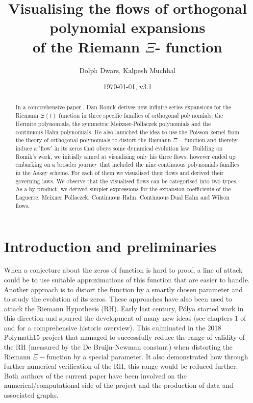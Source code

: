 \documentclass[a4paper,11pt,twoside]{amsart}
\title[Visualising the flows of orthogonal polynomial expansions of the Riemann $\Xi$-function]{Visualising the flows of orthogonal polynomial expansions \\ of the Riemann $\Xi$- function}
\author{Dolph Dwars, Kalpesh Muchhal}
\date{\today, v3.1}
\begin{document}
\begin{abstract}
In a comprehensive paper \cite{rom}, Dan Romik derives new infinite series expansions for the Riemann $\Xi(t)$ function in three specific families of orthogonal polynomials; the Hermite polynomials, the symmetric Meixner-Pollaczek polynomials and the continuous Hahn polynomials. He also launched the idea to use the Poisson kernel from the theory of orthogonal polynomials to distort the Riemann $\Xi-$function and thereby induce a 'flow' in its zeros that obeys some dynamical evolution law. Building on Romik's work, we initially aimed at visualising only his three flows, however ended up embarking on a broader journey that included the nine continuous polynomials families in the Askey scheme. For each of them we visualised their flows and derived their governing laws. We observe that the visualised flows can be categorised into two types. As a by-product, we derived simpler expressions for the expansion coefficients of the Laguerre, Meixner Pollaczek, Continuous Hahn, Continuous Dual Hahn and Wilson flows.  
\end{abstract}

\maketitle

\section{Introduction and preliminaries}

When a conjecture about the zeros of function is hard to proof, a line of attack could be to use suitable approximations of this function that are easier to handle. Another approach is to distort the function by a smartly chosen parameter and to study the evolution of its zeros. These approaches have also been used to attack the Riemann Hypothesis (RH). Early last century, Pólya started work in this direction and spurred the development of many new ideas (see chapters 1 of \cite{rom} and \cite{pol} for a comprehensive historic overview). This culminated in the 2018 Polymath15 project \cite{pol} that managed to successfully reduce the range of validity of the RH (measured by the De Bruijn-Newman constant) when distorting the Riemann $\Xi-$function by a special parameter. It also demonstrated how through further numerical verification of the RH, this range would be reduced further. Both authors of the current paper have been involved on the numerical/computational side of the project and the production of data and associated graphs. 
\end{document}
